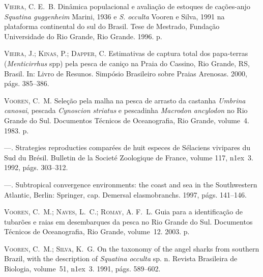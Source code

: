 \documentclass[a4paper,11pt,twoside,showtrims,onecolumn,openright,final]{memoir}
\begin{document}
\begin{thebibliography}{194}
\textsc{Vieira, C. E.~B.}
\newblock Din\^amica populacional e avalia\c{c}\~ao de estoques de
  ca\c{c}\~oes-anjo \emph{{S}quatina guggenheim} {M}arini, 1936 e \emph{{S}. occulta}
  {V}ooren e {S}ilva, 1991 na plataforma continental do sul do {B}rasil.
\newblock Tese de Mestrado, Funda\c{c}\~ao Universidade do Rio Grande, Rio
  Grande. 1996.
 p.

\textsc{Vieira, J.; Kinas, P.; Dapper, C.}
\newblock Estimativas de captura total dos papa-terras (\emph{{M}enticirrhus} spp)
  pela pesca de cani\c{c}o na {P}raia do {C}assino, {R}io {G}rande, {RS},
  {B}rasil.
\newblock In: Livro de {R}esunos. Simp\'osio Brasileiro sobre Praias Arenosas.
  2000, p\'ags. 385--386.

\textsc{Vooren, C.~M.}
\newblock Sele\c{c}\~ao pela malha na pesca de arrasto da castanha \emph{{U}mbrina
  canosai}, pescada \emph{{C}ynoscion striatus} e pescadinha \emph{{M}acrodon ancylodon} no
  {R}io {G}rande do {S}ul.
\newblock Documentos T\'ecnicos de Oceanografia, Rio Grande, volume~4. 1983.
 p.

---.
\newblock Strategies reproducties compar\'ees de huit especes de {S}\'elaciens
  vivipares du {S}ud du {B}r\'esil.
\newblock Bulletin de la Societ\'e Zoologique de France, volume 117,
  n\raise1ex\hbox{}~3. 1992, p\'ags. 303--312.

---.
\newblock Subtropical convergence environments: the coast and sea in the
  {S}outhwestern {A}tlantic, Berlin: Springer, cap. Demersal elasmobranchs.
  1997, p\'ags. 141--146.

\textsc{Vooren, C.~M.; Naves, L.~C.; Romay, A. F.~L.}
\newblock Guia para a identifica\c{c}\~ao de tubar\~oes e raias em desembarques
  da pesca no {R}io {G}rande do {S}ul.
\newblock Documentos T\'ecnicos de Oceanografia, Rio Grande, volume~12. 2003.
 p.

\textsc{Vooren, C.~M.; Silva, K.~G.}
\newblock On the taxonomy of the angel sharks from southern {B}razil, with the
  description of \emph{{S}quatina occulta} sp. n.
\newblock Revista Brasileira de Biologia, volume~51,
  n\raise1ex\hbox{}~3. 1991, p\'ags. 589--602.


\end{thebibliography}
\end{document}
